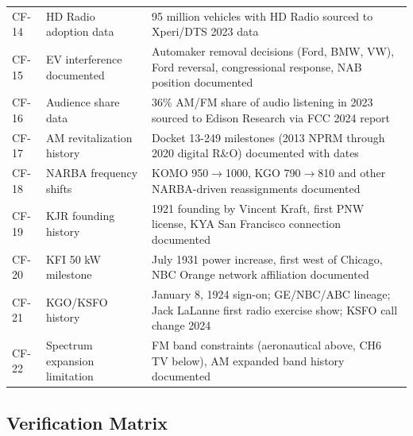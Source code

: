 \documentclass[11pt,letterpaper]{article}
\begin{document}
\begin{asciibox}
\begin{center}
\begin{tabularx}{\textwidth}{C{1.5cm}L{3.5cm}X}
CF-14 & HD Radio adoption data & 95 million vehicles with HD Radio sourced to Xperi/DTS 2023 data \\
CF-15 & EV interference documented & Automaker removal decisions (Ford, BMW, VW), Ford reversal, congressional response, NAB position documented \\
CF-16 & Audience share data & 36\% AM/FM share of audio listening in 2023 sourced to Edison Research via FCC 2024 report \\
CF-17 & AM revitalization history & Docket 13-249 milestones (2013 NPRM through 2020 digital R\&O) documented with dates \\
CF-18 & NARBA frequency shifts & KOMO 950$\to$1000, KGO 790$\to$810 and other NARBA-driven reassignments documented \\
CF-19 & KJR founding history & 1921 founding by Vincent Kraft, first PNW license, KYA San Francisco connection documented \\
CF-20 & KFI 50 kW milestone & July 1931 power increase, first west of Chicago, NBC Orange network affiliation documented \\
CF-21 & KGO/KSFO history & January 8, 1924 sign-on; GE/NBC/ABC lineage; Jack LaLanne first radio exercise show; KSFO call change 2024 \\
CF-22 & Spectrum expansion limitation & FM band constraints (aeronautical above, CH6 TV below), AM expanded band history documented \\
\bottomrule
\end{tabularx}
\end{center}

\subsection{Verification Matrix}


\end{asciibox}
\end{document}
